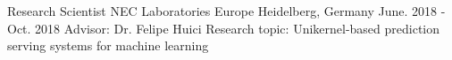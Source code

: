 \cventry
{Research Scientist} %
{NEC Laboratories Europe} %
{Heidelberg, Germany} %
{June. 2018 - Oct. 2018} %
{ %
Advisor: Dr. Felipe Huici\newline
Research topic: Unikernel-based prediction serving systems for machine learning
}
